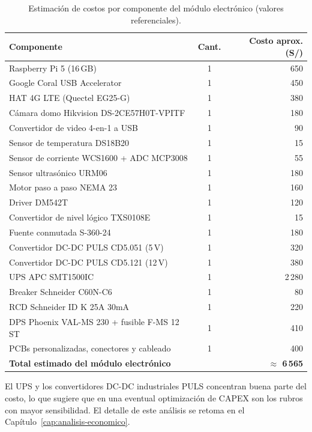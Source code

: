 \begin{table}[H]
  \centering
  \caption{Estimación de costos por componente del módulo electrónico (valores referenciales).}
  \label{tab:costos-electronica}
  \footnotesize
  \begin{tabular}{@{}p{7.5cm}cr@{}}
    \toprule
    \textbf{Componente} & \textbf{Cant.} & \textbf{Costo aprox. (S/)}\\
    \midrule
    Raspberry Pi 5 (16\,GB) & 1 & 650\\
    Google Coral USB Accelerator & 1 & 450\\
    HAT 4G LTE (Quectel EG25-G) & 1 & 380\\
    Cámara domo Hikvision DS-2CE57H0T-VPITF & 1 & 180\\
    Convertidor de video 4-en-1 a USB & 1 & 90\\
    Sensor de temperatura DS18B20 & 1 & 15\\
    Sensor de corriente WCS1600 + ADC MCP3008 & 1 & 55\\
    Sensor ultrasónico URM06 & 1 & 180\\
    Motor paso a paso NEMA 23 & 1 & 160\\
    Driver DM542T & 1 & 120\\
    Convertidor de nivel lógico TXS0108E & 1 & 15\\
    Fuente conmutada S-360-24 & 1 & 180\\
    Convertidor DC-DC PULS CD5.051 (5\,V) & 1 & 320\\
    Convertidor DC-DC PULS CD5.121 (12\,V) & 1 & 380\\
    UPS APC SMT1500IC & 1 & 2\,280\\
    Breaker Schneider C60N-C6 & 1 & 80\\
    RCD Schneider ID K 25A 30mA & 1 & 220\\
    DPS Phoenix VAL-MS 230 + fusible F-MS 12 ST & 1 & 410\\
    PCBs personalizadas, conectores y cableado & 1 & 400\\
    \midrule
    \textbf{Total estimado del módulo electrónico} & & \textbf{$\approx$ 6\,565}\\
    \bottomrule
  \end{tabular}
\end{table}

El UPS y los convertidores DC-DC industriales PULS concentran buena parte del costo, lo que sugiere que en
una eventual optimización de CAPEX son los rubros con mayor sensibilidad. El detalle de este análisis se
retoma en el Capítulo~\ref{cap:analisis-economico}.

